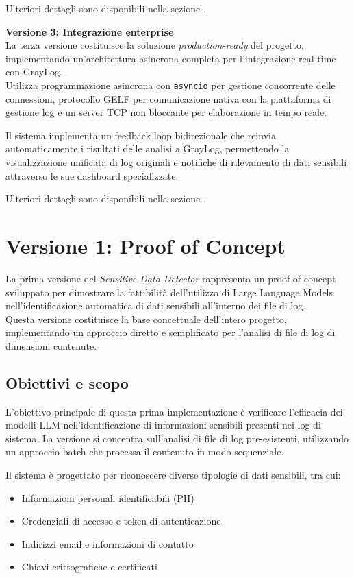 \documentclass[12pt]{report}
\begin{document}
Ulteriori dettagli sono disponibili nella sezione .

\textbf{Versione 3: Integrazione enterprise} \\
La terza versione costituisce la soluzione \textit{production-ready} del progetto, implementando un'architettura asincrona completa per l'integrazione real-time con GrayLog. \\
Utilizza programmazione asincrona con \texttt{asyncio} per gestione concorrente delle connessioni, protocollo GELF per comunicazione nativa con la piattaforma di gestione log e un server TCP non bloccante per elaborazione in tempo reale.

Il sistema implementa un feedback loop bidirezionale che reinvia automaticamente i risultati delle analisi a GrayLog, permettendo la visualizzazione unificata di log originali e notifiche di rilevamento di dati sensibili attraverso le sue dashboard specializzate.

Ulteriori dettagli sono disponibili nella sezione .


\section{Versione 1: Proof of Concept}
\label{sec:ver1}

La prima versione del \textit{Sensitive Data Detector} rappresenta un proof of concept sviluppato per dimostrare la fattibilità dell'utilizzo di Large Language Models nell'identificazione automatica di dati sensibili all'interno dei file di log. \\
Questa versione costituisce la base concettuale dell'intero progetto, implementando un approccio diretto e semplificato per l'analisi di file di log di dimensioni contenute.

\subsection{Obiettivi e scopo}
\label{subsec:ver1_obiettivi}

L'obiettivo principale di questa prima implementazione è verificare l'efficacia dei modelli LLM nell'identificazione di informazioni sensibili presenti nei log di sistema. La versione si concentra sull'analisi di file di log pre-esistenti, utilizzando un approccio batch che processa il contenuto in modo sequenziale.

Il sistema è progettato per riconoscere diverse tipologie di dati sensibili, tra cui:
\begin{itemize}
    \item Informazioni personali identificabili (PII)
    \item Credenziali di accesso e token di autenticazione
    \item Indirizzi email e informazioni di contatto
    \item Chiavi crittografiche e certificati
\end{itemize}
\end{document}
